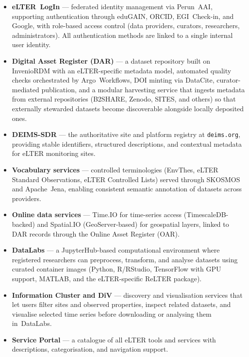 \begin{itemize}
  \item \textbf{eLTER~LogIn} --- federated identity management via Perun~AAI, supporting
        authentication through eduGAIN, ORCID, EGI~Check-in, and Google, with
        role-based access control (data providers, curators, researchers,
        administrators). All authentication methods are linked to a single internal
        user identity.
  \item \textbf{Digital Asset Register (DAR)} --- a dataset repository built on
        InvenioRDM with an eLTER-specific metadata model, automated quality checks
        orchestrated by Argo~Workflows, DOI minting via DataCite, curator-mediated
        publication, and a modular harvesting service that ingests metadata from
        external repositories (B2SHARE, Zenodo, SITES, and others) so that externally
        stewarded datasets become discoverable alongside locally deposited ones.
  \item \textbf{DEIMS-SDR} --- the authoritative site and platform registry at
        \texttt{deims.org}, providing stable identifiers, structured descriptions,
        and contextual metadata for eLTER monitoring sites.
  \item \textbf{Vocabulary services} --- controlled terminologies (EnvThes,
        eLTER Standard Observations, eLTER Controlled Lists) served through SKOSMOS
        and Apache~Jena, enabling consistent semantic annotation of datasets across
        providers.
  \item \textbf{Online data services} --- Time.IO for time-series access
        (TimescaleDB-backed) and Spatial.IO (GeoServer-based) for geospatial layers,
        linked to DAR records through the Online Asset Register (OAR).
  \item \textbf{DataLabs} --- a JupyterHub-based computational environment where
        registered researchers can preprocess, transform, and analyse datasets using
        curated container images (Python, R/RStudio, TensorFlow with GPU support,
        MATLAB, and the eLTER-specific ReLTER package).
  \item \textbf{Information Cluster and DiV} --- discovery and visualisation services
        that let users filter sites and observed properties, inspect related datasets,
        and visualise selected time series before downloading or analysing them
        in~DataLabs.
  \item \textbf{Service Portal} --- a catalogue of all eLTER tools and services with
        descriptions, categorisation, and navigation support.
\end{itemize}

